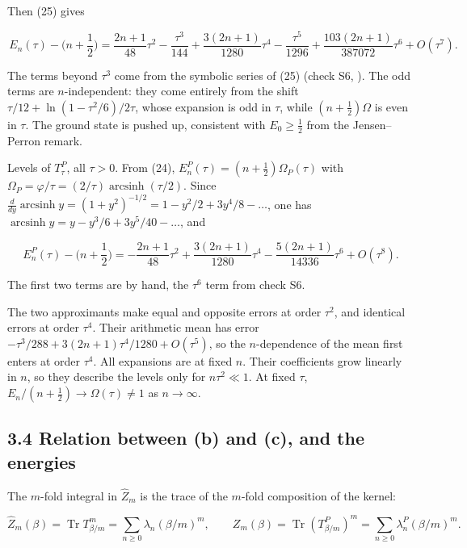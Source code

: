 \documentclass[11pt,a4paper]{article}
\newcommand{\tagmark}[1]{\marginnote{\scriptsize\ttfamily #1}}
\newcommand{\Dtag}{\tagmark{[D]}}   %
\newcommand{\Ntag}{\tagmark{[N]}}   %
\begin{document}
Then (25) gives

\[
\boxed{\,E_n(\tau) - \Big(n+\frac12\Big) = \frac{2n+1}{48}\tau^2 - \frac{\tau^3}{144} + \frac{3(2n+1)}{1280}\tau^4 - \frac{\tau^5}{1296} + \frac{103(2n+1)}{387072}\tau^6 + O(\tau^7).\,} \tag{27}
\]

The terms beyond \(\tau^3\) come from the symbolic series of (25) (check
S6, \Ntag{}). The odd terms are \(n\)-independent: they come entirely
from the shift \(\tau/12 + \ln(1-\tau^2/6)/2\tau\), whose expansion is
odd in \(\tau\), while \((n+\tfrac12)\Omega\) is even in \(\tau\). The
ground state is pushed up, consistent with \(E_0\ge\tfrac12\) from the
Jensen--Perron remark.

Levels of \(T^P_\tau\), all \(\tau>0\). From (24),
\(E^P_n(\tau) = (n+\tfrac12)\Omega_P(\tau)\) with
\(\Omega_P = \varphi/\tau = (2/\tau)\operatorname{arcsinh}(\tau/2)\).
Since
\(\frac{d}{dy}\operatorname{arcsinh}y = (1+y^2)^{-1/2} = 1 - y^2/2 + 3y^4/8 - \dots\),
one has \(\operatorname{arcsinh}y = y - y^3/6 + 3y^5/40 - \dots\), and

\[
\boxed{\,E^P_n(\tau) - \Big(n+\frac12\Big) = -\frac{2n+1}{48}\tau^2 + \frac{3(2n+1)}{1280}\tau^4 - \frac{5(2n+1)}{14336}\tau^6 + O(\tau^8).\,} \tag{28}
\]

\Dtag{} The first two terms are by hand, the \(\tau^6\) term from check
S6.

The two approximants make equal and opposite errors at order \(\tau^2\),
and identical errors at order \(\tau^4\). Their arithmetic mean has
error \(-\tau^3/288 + 3(2n+1)\tau^4/1280 + O(\tau^5)\), so the
\(n\)-dependence of the mean first enters at order \(\tau^4\). All
expansions are at fixed \(n\). Their coefficients grow linearly in
\(n\), so they describe the levels only for \(n\tau^2\ll1\). At fixed
\(\tau\), \(E_n/(n+\tfrac12)\to\Omega(\tau)\ne1\) as \(n\to\infty\).

\hypertarget{relation-between-b-and-c-and-the-energies}{%
\subsection{3.4 Relation between (b) and (c), and the
energies}\label{relation-between-b-and-c-and-the-energies}}

\Dtag{} The \(m\)-fold integral in \(\hat Z_m\) is the trace of the
\(m\)-fold composition of the kernel:

\[
\hat Z_m(\beta) = \operatorname{Tr}T_{\beta/m}^m = \sum_{n\ge0}\lambda_n(\beta/m)^m,\qquad Z_m(\beta) = \operatorname{Tr}(T^P_{\beta/m})^m = \sum_{n\ge0}\lambda^P_n(\beta/m)^m. \tag{29}
\]
\end{document}
